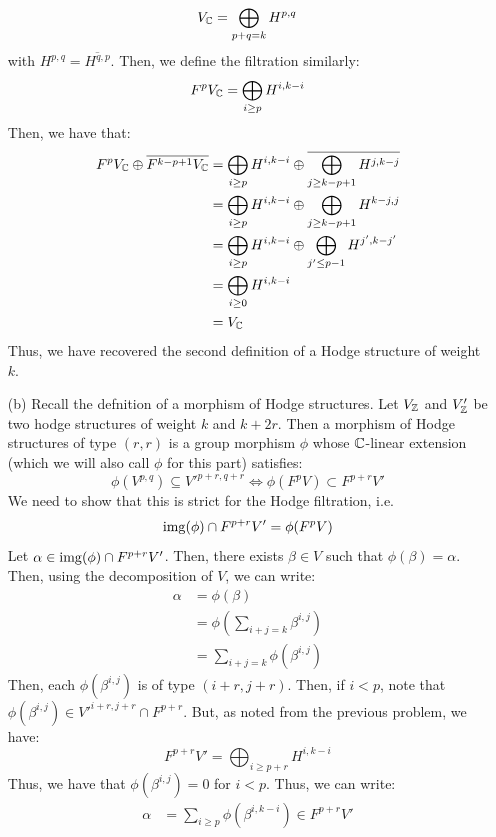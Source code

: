 \documentclass[12pt]{article}
\begin{document}
\begin{solution}
\begin{enumerate}
        \[ V_\C = \bigoplus_{p + q = k} H^{p, q}\]
        with $H^{p, q} = \overline{H^{q, p}}$. Then, we define the filtration similarly:
        \[ F^p V_\C = \bigoplus_{i \geq p} H^{i, k-i}\]
        Then, we have that: 
        \begin{align*}
            F^p V_\C \oplus \overline{F^{k-p+1} V_\C} &= \bigoplus_{i \geq p} H^{i, k-i} \oplus \overline{\bigoplus_{j \geq k-p+1} H^{j, k-j}} \\
            &= \bigoplus_{i \geq p} H^{i, k-i} \oplus \bigoplus_{j \geq k-p+1} H^{k-j, j} \\
            &= \bigoplus_{i \geq p} H^{i, k-i} \oplus \bigoplus_{j' \leq p-1} H^{j', k-j'} \\
            &= \bigoplus_{i \geq 0} H^{i, k-i}  \\
            &= V_\C
        \end{align*}
        Thus, we have recovered the second definition of a Hodge structure of weight $k$.
        \item[(b)] Recall the defnition of a morphism of Hodge structures. Let $V_\mathbb Z$ and $V'_\mathbb Z$ be two hodge structures of weight $k$ and $k+2r$. Then a morphism of Hodge structures of type $(r, r)$ is a group morphism $\phi$ whose $\mathbb C$-linear extension (which we will also call $\phi$ for this part) satisfies: 
        \[ \phi(V^{p,q}) \subseteq {V'}^{p+r, q+r} \iff \phi(F^p V) \subset F^{p+r} V'\]
        We need to show that this is strict for the Hodge filtration, i.e.
        \[ \operatorname{img}(\phi) \cap F^{p+r} V' = \phi(F^p V)\]
        Let $\alpha \in \operatorname{img}(\phi) \cap F^{p+r} V'$. Then, there exists $\beta \in V$ such that $\phi(\beta) = \alpha$. Then, using the decomposition of $V$, we can write: 
        \begin{align*}
            \alpha &= \phi(\beta) \\
            &= \phi\left(\sum_{i+j = k} \beta^{i,j}\right) \\
            &= \sum_{i+j = k} \phi(\beta^{i,j}) 
        \end{align*}
        Then, each $\phi(\beta^{i,j})$ is of type $(i+r, j+r)$. Then, if $i < p$, note that $\phi(\beta^{i, j}) \in {V'}^{i+r, j+r} \cap F^{p+r}$. But, as noted from the previous problem, we have:
        \[ F^{p+r} V' = \bigoplus_{i \geq p+r} H^{i, k-i} \]
        Thus, we have that $\phi(\beta^{i,j}) = 0$ for $i < p$. Thus, we can write:
        \begin{align*}
            \alpha &= \sum_{i \geq p} \phi(\beta^{i,k-i}) \in F^{p+r} V' 
        \end{align*}

\end{enumerate}
\end{solution}
\end{document}
